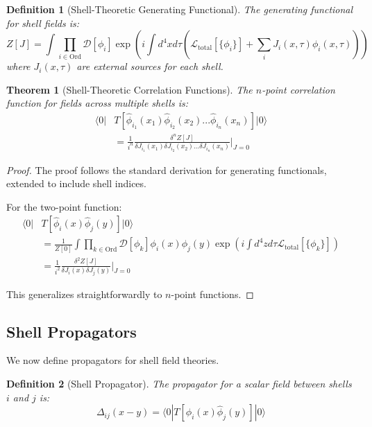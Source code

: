 \documentclass[12pt,a4paper]{article}
\newtheorem{theorem}{Theorem}[section]
\newtheorem{definition}{Definition}[section]
\newcommand{\D}{\mathcal{D}}
\newcommand{\Lagr}{\mathcal{L}}
\begin{document}
\begin{definition}[Shell-Theoretic Generating Functional]
\label{def:generating-functional}
The generating functional for shell fields is:
\begin{equation}
Z[J] = \int \prod_{i \in \text{Ord}} \D[\phi_i] \exp\left(i\int d^4x d\tau \left(\Lagr_{\text{total}}[\{\phi_i\}] + \sum_i J_i(x,\tau)\phi_i(x,\tau)\right)\right)
\end{equation}
where $J_i(x,\tau)$ are external sources for each shell.
\end{definition}

\begin{theorem}[Shell-Theoretic Correlation Functions]
\label{thm:correlation-functions}
The $n$-point correlation function for fields across multiple shells is:
\begin{align}
\langle 0| &T[\hat{\phi}_{i_1}(x_1)\hat{\phi}_{i_2}(x_2)...\hat{\phi}_{i_n}(x_n)]|0 \rangle \\
&= \frac{1}{i^n} \frac{\delta^n Z[J]}{\delta J_{i_1}(x_1) \delta J_{i_2}(x_2)...\delta J_{i_n}(x_n)}\bigg|_{J=0}
\end{align}
\end{theorem}

\begin{proof}
The proof follows the standard derivation for generating functionals, extended to include shell indices.

For the two-point function:
\begin{align}
\langle 0| &T[\hat{\phi}_{i}(x)\hat{\phi}_{j}(y)]|0 \rangle \\
&= \frac{1}{Z[0]}\int \prod_{k \in \text{Ord}} \D[\phi_k] \phi_i(x)\phi_j(y) \exp\left(i\int d^4z d\tau \Lagr_{\text{total}}[\{\phi_k\}]\right) \\
&= \frac{1}{i^2} \frac{\delta^2 Z[J]}{\delta J_{i}(x) \delta J_{j}(y)}\bigg|_{J=0}
\end{align}

This generalizes straightforwardly to $n$-point functions.
\end{proof}

\subsection{Shell Propagators}
\label{subsec:shell-propagators}

We now define propagators for shell field theories.

\begin{definition}[Shell Propagator]
\label{def:shell-propagator}
The propagator for a scalar field between shells $i$ and $j$ is:
\begin{equation}
\Delta_{ij}(x-y) = \langle 0|T[\hat{\phi}_i(x)\hat{\phi}_j(y)]|0\rangle
\end{equation}
\end{definition}
\end{document}
